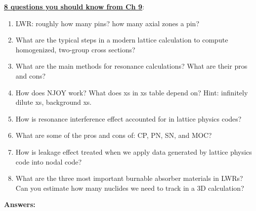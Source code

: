 \documentclass{school-22.211-notes}
\date{May 18, 2013}
\begin{document}
\maketitle


\uline{\textbf{8 questions you should know from Ch 9}}:

\begin{enumerate}
\item LWR: roughly how many pins? how many axial zones a pin?

\bigskip 
  
  \item What are the typical steps in a modern lattice calculation to
  compute homogenized, two-group cross sections? 

\bigskip 

  
\item What are the main methods for resonance calculations? What are
  their pros and cons?

\bigskip 
  
  
\item How does NJOY work? What does xs in xs table depend on?
  Hint: infinitely dilute xs, background xs.

\bigskip 

  
\item How is resonance interference effect accounted for in lattice physics codes?

\bigskip 

  
\item What are some of the pros and cons of: CP, PN, SN, and MOC?

\bigskip 

  
\item How is leakage effect treated when we apply data generated by
  lattice physics code into nodal code?

 \bigskip 
 
  
\item What are the three most important burnable absorber materials in
  LWRs? Can you estimate how many nuclides we need to track in a 3D
  calculation?
\end{enumerate}


\iffalse
\clearpage
\textbf{Answers:}
\end{document}
